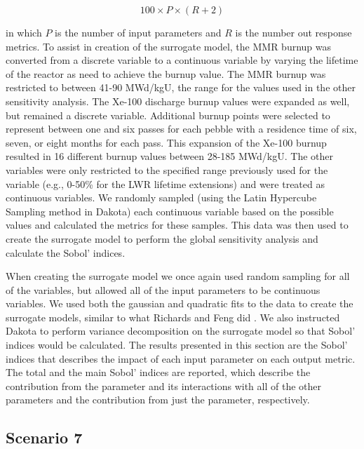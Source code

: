 \begin{equation}
    100\times P\times(R+2)
\end{equation}

in which $P$ is the number of input parameters and $R$ is the number out response 
metrics. To assist in creation of the surrogate model, the \gls{MMR} burnup 
was converted from a discrete variable to a continuous variable by varying 
the lifetime of the reactor as need to achieve the burnup value. The 
\gls{MMR} burnup was restricted to between 41-90 MWd/kgU, the range 
for the values used in the other sensitivity analysis. 
The Xe-100 discharge burnup values were expanded as well, but remained 
a discrete variable. Additional burnup points were selected to represent 
between one and six passes for each pebble with a residence time of six, seven, 
or eight months for each pass. This expansion of the Xe-100 burnup resulted 
in 16 different burnup values between 28-185 MWd/kgU. The other variables were 
only restricted to the specified range previously used for the variable (e.g., 
0-50\% for the \gls{LWR} lifetime extensions) and were treated as continuous 
variables.
We randomly sampled (using the Latin Hypercube Sampling 
method in Dakota) each continuous variable based on the possible values and 
calculated the metrics for these samples. This data was then used to create 
the surrogate model to perform the global sensitivity analysis and 
calculate the Sobol' indices. 

When creating the surrogate model we once again used random sampling for all 
of the variables, but allowed all of the input parameters to be continuous 
variables. 
We used both the gaussian and quadratic fits to the data 
to create the surrogate models, similar to what Richards and 
Feng did \cite{richards_application_2021}. 
We also instructed Dakota to perform variance decomposition 
on the surrogate model so that Sobol' indices would be calculated. The 
results presented in this section are the Sobol' indices that describes the 
impact of each input parameter on each output metric. The total and the main 
Sobol' indices are reported, which describe the contribution from the parameter 
and its interactions with all of the other parameters and the contribution from 
just the parameter, respectively. 

\subsection{Scenario 7}

